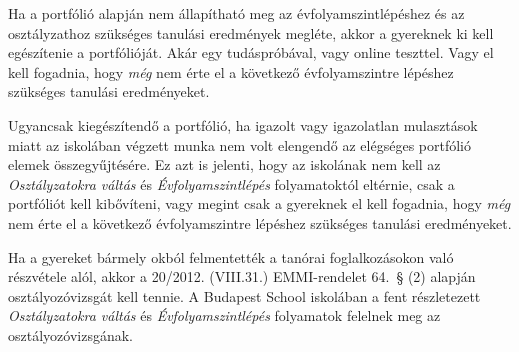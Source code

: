 Ha a portfólió alapján nem állapítható meg az évfolyamszintlépéshez és az osztályzathoz szükséges tanulási eredmények megléte, akkor a gyereknek ki kell egészítenie a portfólióját. Akár egy tudáspróbával, vagy online teszttel. Vagy el kell fogadnia, hogy \emph{még} nem érte el a következő évfolyamszintre lépéshez szükséges tanulási eredményeket.

Ugyancsak kiegészítendő a portfólió, ha igazolt vagy igazolatlan mulasztások miatt az iskolában végzett munka nem volt elengendő az elégséges portfólió elemek összegyűjtésére. Ez azt is jelenti, hogy az iskolának nem kell az \emph{Osztályzatokra váltás} és \emph{Évfolyamszintlépés} folyamatoktól eltérnie, csak a portfóliót kell kibővíteni, vagy megint csak a gyereknek el kell fogadnia, hogy \emph{még} nem érte el a következő évfolyamszintre lépéshez szükséges tanulási eredményeket.

Ha a gyereket bármely okból felmentették a tanórai foglalkozásokon való részvétele alól, akkor a 20/2012. (VIII.31.) EMMI-rendelet 64.~§ (2)  alapján osztályozóvizsgát kell tennie. A Budapest School iskolában a fent részletezett \emph{Osztályzatokra váltás} és \emph{Évfolyamszintlépés} folyamatok  felelnek meg az osztályozóvizsgának.
